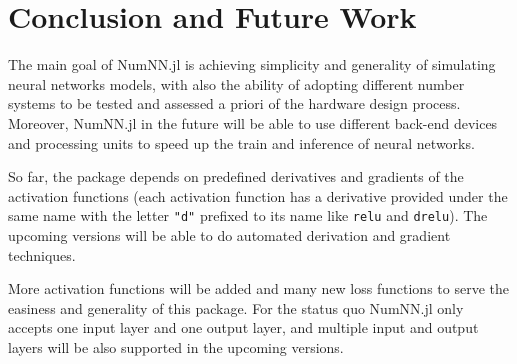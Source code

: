 \section{Conclusion and Future Work}

The main goal of NumNN.jl is achieving simplicity and generality of simulating neural networks models, with also the ability of adopting different number systems to be tested and assessed a priori of the hardware design process. Moreover, NumNN.jl in the future will be able to use different back-end devices and processing units to speed up the train and inference of neural networks. 

So far, the package depends on predefined derivatives and gradients of the activation functions (each activation function has a derivative provided under the same name with the letter \texttt{"d"} prefixed to its name like \texttt{relu} and \texttt{drelu}). The upcoming versions will be able to do automated derivation and gradient techniques.

More activation functions will be added and many new loss functions to serve the easiness and generality of this package. For  the status quo NumNN.jl only accepts one input layer and one output layer, and multiple input and output layers will be also supported in the upcoming versions.